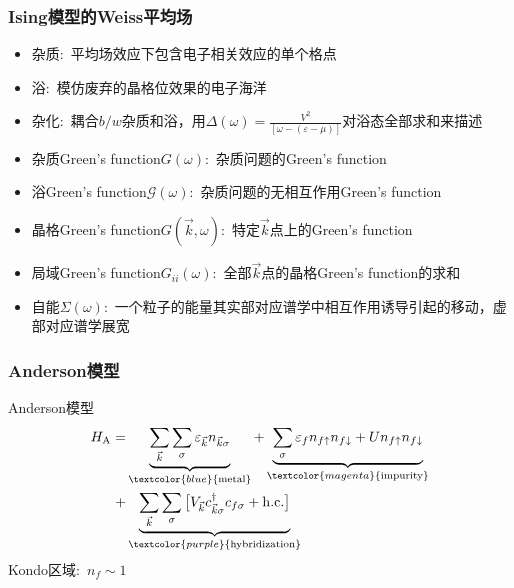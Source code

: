 {\frame
{
	\frametitle{\textrm{Ising}模型的\textrm{Weiss}平均场}
	\begin{itemize}
		\item 杂质:~平均场效应下包含电子相关效应的单个格点
		\item 浴:~模仿废弃的晶格位效果的电子海洋
		\item 杂化:~耦合$b/w$杂质和浴，用$\Delta(\omega)=\frac{V^2}{[\omega-(\varepsilon-\mu)]}$对浴态全部求和来描述
		\item 杂质\textrm{Green's function}$G(\omega)$:~杂质问题的\textrm{Green's function}
		\item 浴\textrm{Green's function}$\mathcal{G}(\omega)$:~杂质问题的无相互作用\textrm{Green's function}
		\item 晶格\textrm{Green's function}$G(\vec k,\omega)$:~特定$\vec k$点上的\textrm{Green's function}
		\item 局域\textrm{Green's function}$G_{ii}(\omega)$:~全部$\vec k$点的晶格\textrm{Green's function}的求和
		\item 自能$\Sigma(\omega)$:~一个粒子的能量其实部对应谱学中相互作用诱导引起的移动，虚部对应谱学展宽
	\end{itemize}
}

\frame
{
	\frametitle{\textrm{Anderson}模型}
	\textrm{Anderson}模型
	\begin{displaymath}
		\begin{aligned}
			H_{\mathrm{A}}=&\underbrace{\sum_{\vec k}\sum_{\sigma}\varepsilon_{\vec k}n_{\vec k\sigma}}_{\textcolor{blue}{\mathrm{metal}}}+\underbrace{\sum_{\sigma}\varepsilon_fn_{f\uparrow}n_{f\downarrow}+Un_{f\uparrow}n_{f\downarrow}}_{\textcolor{magenta}{\mathrm{impurity}}}\\
			+&\underbrace{\sum_{\vec k}\sum_{\sigma}\big[V_{\vec k}c_{\vec k\sigma}^{\dag}c_{f\sigma}+\mathrm{h.c.}\big]}_{\textcolor{purple}{\mathrm{hybridization}}}
		\end{aligned}
	\end{displaymath}
	\textrm{Kondo}区域:~$n_f\sim1$

{\fontsize{8.2pt}{6.2pt}}
}

}
